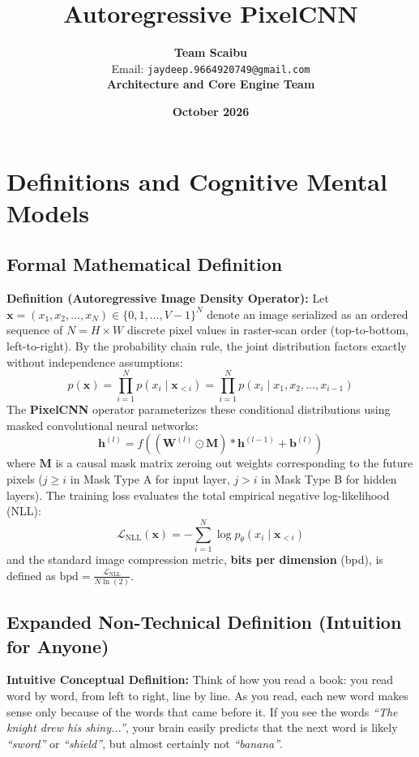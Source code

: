 \documentclass[11pt,a4paper]{article}
\title{\textbf{Autoregressive PixelCNN}}
\author{\textbf{Team Scaibu} \\ \small Email: \texttt{jaydeep.9664920749@gmail.com} \\ \small \textbf{Architecture and Core Engine Team}}
\date{\textbf{October 2026}}
\theoremstyle{definition}
\begin{document}
\maketitle

\section{Definitions and Cognitive Mental Models}

\subsection{Formal Mathematical Definition}
\textbf{Definition (Autoregressive Image Density Operator):}
Let $\mathbf{x} = (x_1, x_2, \dots, x_N) \in \{0, 1, \dots, V - 1\}^N$ denote an image serialized as an ordered sequence of $N = H \times W$ discrete pixel values in raster-scan order (top-to-bottom, left-to-right). By the probability chain rule, the joint distribution factors exactly without independence assumptions:
{\boldmath
\begin{equation}
p(\mathbf{x}) = \prod_{i=1}^N p(x_i \mid \mathbf{x}_{<i}) = \prod_{i=1}^N p(x_i \mid x_1, x_2, \dots, x_{i-1})
\end{equation}
}
The \textbf{PixelCNN} operator parameterizes these conditional distributions using masked convolutional neural networks:
{\boldmath
\begin{equation}
\mathbf{h}^{(l)} = f\left( \left(\mathbf{W}^{(l)} \odot \mathbf{M}\right) * \mathbf{h}^{(l-1)} + \mathbf{b}^{(l)} \right)
\end{equation}
}
where $\mathbf{M}$ is a causal mask matrix zeroing out weights corresponding to the future pixels ($j \ge i$ in Mask Type A for input layer, $j > i$ in Mask Type B for hidden layers). The training loss evaluates the total empirical negative log-likelihood (NLL):
{\boldmath
\begin{equation}
\mathcal{L}_{\text{NLL}}(\mathbf{x}) = -\sum_{i=1}^N \log p_\theta(x_i \mid \mathbf{x}_{<i})
\end{equation}
}
and the standard image compression metric, \textbf{bits per dimension} (bpd), is defined as $\text{bpd} = \frac{\mathcal{L}_{\text{NLL}}}{N \ln(2)}$.

\subsection{Expanded Non-Technical Definition (Intuition for Anyone)}
\textbf{Intuitive Conceptual Definition:}
Think of how you read a book: you read word by word, from left to right, line by line. As you read, each new word makes sense only because of the words that came before it. If you see the words \emph{``The knight drew his shiny...''}, your brain easily predicts that the next word is likely \emph{``sword''} or \emph{``shield''}, but almost certainly not \emph{``banana''}.
\end{document}
